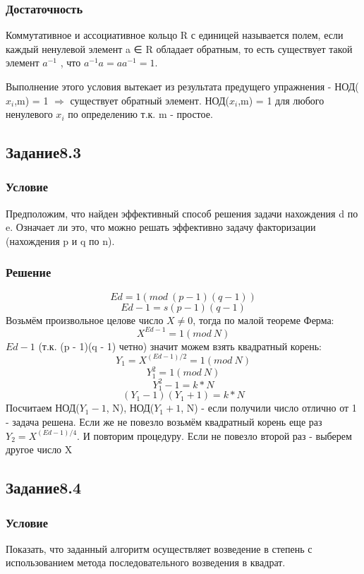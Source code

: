 \documentclass[10pt,a4paper]{article}
\begin{document}
\subsubsection*{Достаточность}
Коммутативное и ассоциативное кольцо R с единицей называется полем, если
каждый ненулевой элемент a ∈ R обладает обратным, то есть существует
такой элемент $a^{−1}$ , что $a^{−1} a = aa^{−1} = 1$.

Выполнение этого условия вытекает из результата предущего упражнения -
НОД($x_i$,m) = 1 $\Rightarrow$ существует обратный элемент.
НОД($x_i$,m) = 1 для любого ненулевого $x_i$ по определению т.к. m - простое.

\subsection*{Задание8.3}
\subsubsection*{Условие}
Предположим, что найден эффективный способ решения задачи нахождения d
по e. Означает ли это, что можно решать эффективно задачу факторизации
(нахождения p и q по n).
\subsubsection*{Решение}
$$ Ed = 1 (mod\ (p - 1)(q - 1)) $$
$$ Ed - 1 = s(p - 1)(q - 1) $$
Возьмём произвольное целове число $ X \neq 0 $, тогда по малой теореме Ферма:
$$ X^{Ed-1} = 1 (mod\ N) $$
$ Ed - 1 $ (т.к. (p - 1)(q - 1) четно) значит можем взять квадратный корень:
$$ Y_1 = X^{(Ed-1)/2} = 1 (mod\ N) $$
$$ Y_1^2 = 1 (mod\ N) $$
$$ Y_1^2 - 1 = k*N $$
$$ (Y_1 - 1)(Y_1 + 1) = k*N $$
Посчитаем НОД($Y_1 - 1$, N), НОД($Y_1 + 1$, N) - если получили число
отлично от 1 - задача решена. Если же не повезло возьмём квадратный 
корень еще раз $ Y_2 = X^{(Ed-1)/4} $. И повторим процедуру. Если не
повезло второй раз - выберем другое число X

\subsection*{Задание8.4}
\subsubsection*{Условие}
Показать, что заданный алгоритм осуществляет возведение в степень с
использованием метода последовательного возведения в квадрат.
\end{document}
